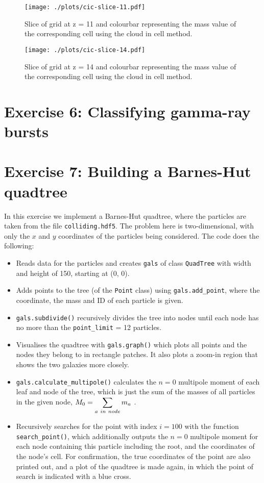 \documentclass{article}
\begin{document}
\begin{figure}[h]
\centering
\begin{minipage}[t]{7.8cm}
    \centering
    \texttt{[image: ./plots/cic-slice-11.pdf]}
    \caption{Slice of grid at z = 11 and colourbar representing the mass value of the corresponding cell using the cloud in cell method.}
    \label{fig:cslice11}
\end{minipage}
\qquad
\begin{minipage}[t]{7.8cm}
    \centering
    \texttt{[image: ./plots/cic-slice-14.pdf]}
    \caption{Slice of grid at z = 14 and colourbar representing the mass value of the corresponding cell using the cloud in cell method.}
    \label{fig:cslice14}
\end{minipage}
\end{figure}

\section{Exercise 6: Classifying gamma-ray bursts}

\section{Exercise 7: Building a Barnes-Hut quadtree}
In this exercise we implement a Barnes-Hut quadtree,  where the particles are taken from the file \verb+colliding.hdf5+. The problem here is two-dimensional, with only the $x$ and $y$ coordinates of the particles being considered. The code does the following:
\begin{itemize}
    \item Reads data for the particles and creates \verb+gals+ of class \verb+QuadTree+ with width and height of 150, starting at (0, 0). 
    \item Adds points to the tree (of the \verb+Point+ class) using \verb+gals.add_point+, where the coordinate, the mass and ID of each particle is given.
    \item \verb+gals.subdivide()+ recursively divides the tree into nodes until each node has no more than the \verb+point_limit+ = 12 particles.
    \item Visualises the quadtree with \verb+gals.graph()+ which plots all points and the nodes they belong to in rectangle patches. It also plots a zoom-in region that shows the two galaxies more closely.
    \item \verb+gals.calculate_multipole()+ calculates the $n=0$ multipole moment of each leaf and node of the tree, which is just the sum of the masses of all particles in the given node, $M_0 = \scriptscriptstyle\displaystyle\sum_{a\ in\ node}m_a$ . 
    \item Recursively searches for the point with index $i = 100$ with the function \verb+search_point()+, which additionally outputs the $n=0$ multipole moment for each node containing this particle including the root, and the coordinates of the node's cell. For confirmation, the true coordinates of the point are also printed out, and a plot of the quadtree is made again, in which the point of search is indicated with a blue cross. 
\end{itemize}

\end{document}
